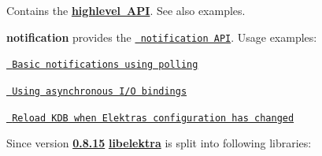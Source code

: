 
\begin{DoxyCode}{0}
\end{DoxyCode}


Contains the {\bfseries{\mbox{\hyperlink{src_libs_highlevel_README_md}{highlevel A\+PI}}}}. See also examples.


\begin{DoxyCode}{0}
\end{DoxyCode}


{\bfseries{notification}} provides the \href{https://doc.libelektra.org/api/current/html/group__kdbnotification.html}{\texttt{ notification A\+PI}}. Usage examples\+:


\begin{DoxyItemize}
\item \href{https://www.libelektra.org/examples/notificationpolling}{\texttt{ Basic notifications using polling}}
\item \href{https://www.libelektra.org/examples/notificationasync}{\texttt{ Using asynchronous I/O bindings}}
\item \href{https://www.libelektra.org/examples/notificationreload}{\texttt{ Reload K\+DB when Elektra\textquotesingle{}s configuration has changed}}
\end{DoxyItemize}

Since version {\bfseries{\mbox{\hyperlink{doc_decisions_library_split_md}{0.8.15}}}} {\bfseries{\mbox{\hyperlink{md_src_libs_elektra_README_src_libs_elektra_README_md}{libelektra}}}} is split into following libraries\+:



